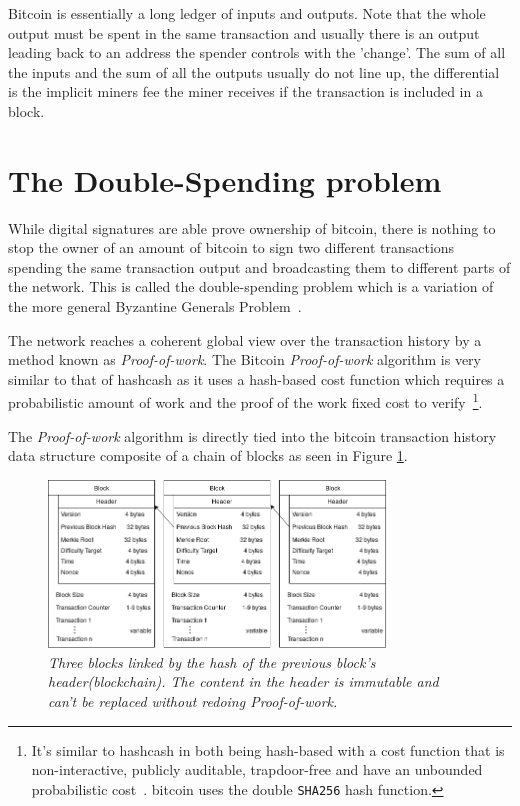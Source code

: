 Bitcoin is essentially a long ledger of inputs and outputs. Note that the whole output must be spent in the same transaction and usually there is an output leading back to an address the spender controls with the 'change'. The sum of all the inputs and the sum of all the outputs usually do not line up, the differential is the implicit miners fee the miner receives if the transaction is included in a block. 

\section{The Double-Spending problem}

While digital signatures are able prove ownership of bitcoin, there is nothing to stop the owner of an amount of bitcoin to sign two different transactions spending the same transaction output and broadcasting them to different parts of the network. This is called the double-spending problem which is a variation of the more general Byzantine Generals Problem~\cite{lamport:shostak:byzantine:generals}.


The network reaches a coherent global view over the transaction history by a method known as \textit{Proof-of-work}. The Bitcoin \textit{Proof-of-work} algorithm is very similar to that of hashcash as it uses a hash-based cost function which requires a probabilistic amount of work and the proof of the work fixed cost to verify~\cite{back:hashcash}\footnote{It's similar to hashcash in both being \gls{hash}-based with a cost function that is non-interactive, publicly auditable, trapdoor-free and have an unbounded probabilistic cost~\cite{back:hashcash}.
\gls{bitcoin} uses the double \texttt{SHA256} hash function.}.

The \textit{Proof-of-work} algorithm is directly tied into the bitcoin transaction history data structure composite of a chain of blocks as seen in Figure \ref{fig:blockchain}.

\begin{figure}[!htb]
	\hspace*{-0.4cm} 
	\centering
	\includegraphics[width=9cm]{images/blockchain.png}
	\caption{\textit{Three blocks linked by the hash of the previous block's header(\gls{blockchain}). The content in the header is immutable and can't be replaced without redoing \textit{Proof-of-work}.
	}}
	\label{fig:blockchain}
	\hspace{2mm} 
\end{figure}


